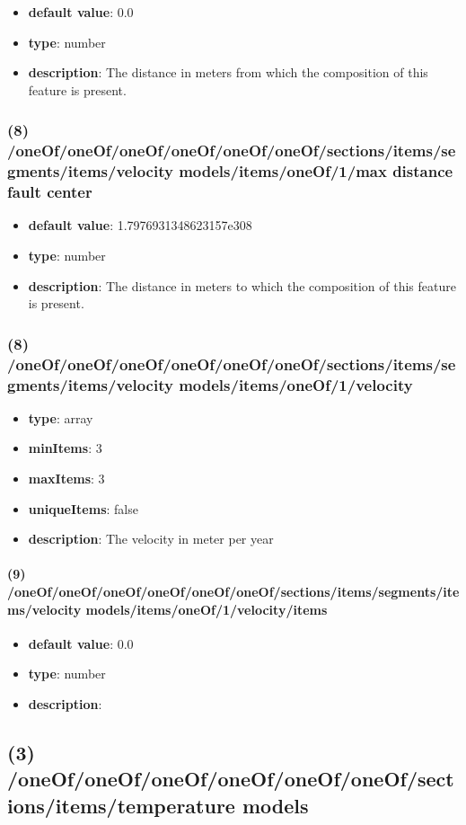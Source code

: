 \begin{itemize}[leftmargin=8em]\item {\bf default value}: 0.0
\item {\bf type}: number
\item {\bf description}: The distance in meters from which the composition of this feature is present.
\end{itemize}\subsubsection{(8) /oneOf/oneOf/oneOf/oneOf/oneOf/oneOf/sections/items/segments/items/velocity models/items/oneOf/1/max distance fault center}
\begin{itemize}[leftmargin=8em]\item {\bf default value}: 1.7976931348623157e308
\item {\bf type}: number
\item {\bf description}: The distance in meters to which the composition of this feature is present.
\end{itemize}\subsubsection{(8) /oneOf/oneOf/oneOf/oneOf/oneOf/oneOf/sections/items/segments/items/velocity models/items/oneOf/1/velocity}
\begin{itemize}[leftmargin=8em]\item {\bf type}: array
\item {\bf minItems}: 3
\item {\bf maxItems}: 3
\item {\bf uniqueItems}: false
\item {\bf description}: The velocity in meter per year
\end{itemize}\paragraph{(9) /oneOf/oneOf/oneOf/oneOf/oneOf/oneOf/sections/items/segments/items/velocity models/items/oneOf/1/velocity/items}
\begin{itemize}[leftmargin=9em]\item {\bf default value}: 0.0
\item {\bf type}: number
\item {\bf description}: 
\end{itemize}\subsection{(3) /oneOf/oneOf/oneOf/oneOf/oneOf/oneOf/sections/items/temperature models}
